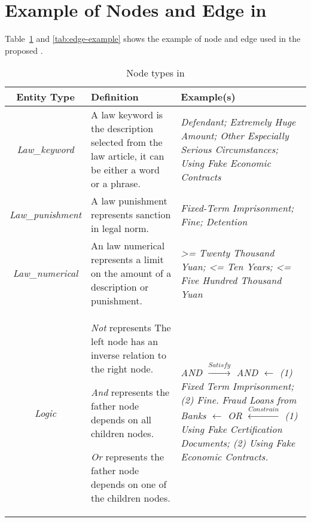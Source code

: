 \section{Example of Nodes and Edge in \lawgraph{}}
\label{ne}

Table~\ref{tab:node-example} and \ref{tab:edge-example} shows the example of node and edge used in the proposed \lawgraph{}.

\begin{table}
    \centering
    \tiny
    \caption{Node types in \lawgraph{}}
    \begin{tabular}{c|p{}|p{}}
    \hline
    \hline
        Entity Type & Definition & Example(s)  \\
        \hline
        \textit{Law\_keyword} & A law keyword is the description selected from the law article, it can be either a word or a phrase. & \textit{Defendant; Extremely Huge Amount; Other Especially Serious Circumstances; Using Fake Economic Contracts}\\
        \hline
        \textit{Law\_punishment} & A law punishment represents sanction in legal norm. & \textit{Fixed-Term Imprisonment; Fine; Detention}\\
        \hline
        \textit{Law\_numerical} & An law numerical represents a limit on the amount of a description or punishment. & \textit{>= Twenty Thousand Yuan; <= Ten Years; <= Five Hundred Thousand Yuan}\\
        \hline
        \textit{Logic} & \textit{Not} represents The left node has an inverse relation to the right node. 
        
        \textit{And} represents the father node depends on all children nodes. 
        
        \textit{Or} represents the father node depends on one of the children nodes. & \textit{AND ${\stackrel{Satisfy}\longrightarrow}$ AND ${\longleftarrow}$ (1) Fixed Term Imprisonment; (2) Fine.}
        \textit{Fraud Loans from Banks ${\longleftarrow}$ OR ${\stackrel{Constrain}\longleftarrow}$ (1) Using Fake Certification Documents; (2) Using Fake Economic Contracts.}\\
        \hline
        \hline
    \end{tabular}
    \label{tab:node-example}
\end{table}

